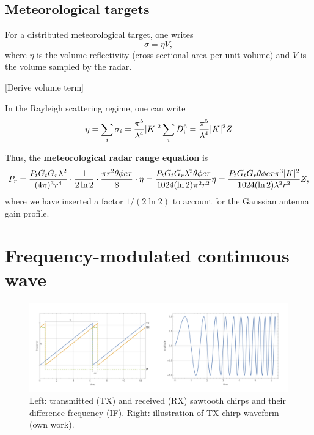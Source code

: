 \documentclass{article}
\DeclarePairedDelimiter\abs{\lvert}{\rvert}%
\begin{document}
	\subsection{Meteorological targets}
	For a distributed meteorological target, one writes
	\begin{equation}
		\sigma = \eta V,
	\end{equation}
	where \(\eta\) is the volume reflectivity (cross-sectional area per unit volume) and \(V\) is the volume sampled by the radar.

	[Derive volume term]

	In the Rayleigh scattering regime, one can write
	\begin{equation}
		\eta = \sum_i{\sigma_i} = \frac{\pi^5}{\lambda^4} \abs{K}^2 \sum_i{D_i^6} = \frac{\pi^5}{\lambda^4} \abs{K}^2 Z
	\end{equation}
	
	Thus, the \textbf{meteorological radar range equation} is
	\begin{equation}
		P_r = \frac{P_t G_t G_r \lambda^2}{(4 \pi)^3 r^4} \cdot \frac{1}{2\ln{2}} \cdot \frac{\pi r^2 \theta \phi c \tau}{8} \cdot \eta = \frac{P_t G_t G_r \lambda^2 \theta \phi c \tau}{1024 (\ln{2}) \pi^2 r^2} \eta = \frac{P_t G_t G_r \theta \phi c \tau \pi^3 \abs{K}^2}{1024 (\ln{2}) \lambda^2 r^2} Z,
		\label{eqn:MeteoRange}
	\end{equation}
	where we have inserted a factor \(1/(2\ln{2})\) to account for the Gaussian antenna gain profile.\supercite{ProbertJones}

	\pagebreak

	\section{Frequency-modulated continuous wave}
	\begin{figure}
		\includegraphics[width=\textwidth]{chirp-2}
		\caption{Left: transmitted (TX) and received (RX) sawtooth chirps and their difference frequency (IF). Right: illustration of TX chirp waveform (own work).}
		\label{fig:Chirp}
	\end{figure}
\end{document}

